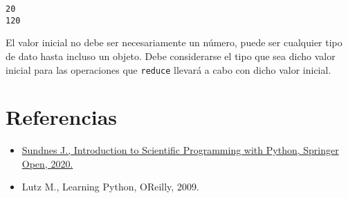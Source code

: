 \begin{verbatim}
20
120
\end{verbatim}

El valor inicial no debe ser necesariamente un número, puede ser
cualquier tipo de dato hasta incluso un objeto. Debe considerarse el
tipo que sea dicho valor inicial para las operaciones que
\texttt{reduce} llevará a cabo con dicho valor inicial.

\section{Referencias}

\begin{itemize}
\item
  \href{https://link.springer.com/book/10.1007/978-3-030-50356-7}{Sundnes
  J., Introduction to Scientific Programming with Python, Springer Open,
  2020.}
\item
  Lutz M., Learning Python, O\textquotesingle Reilly, 2009.
\end{itemize}
